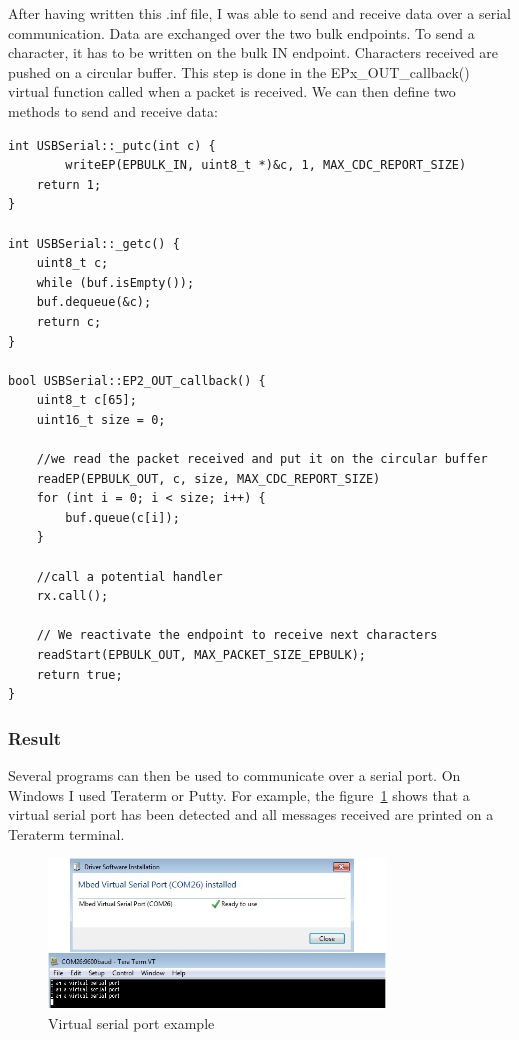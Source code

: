 \documentclass[pdftex,10pt,a4paper]{report}
\begin{document}
After having written this .inf file, I was able to send and receive data over a serial communication. Data are exchanged over the two bulk endpoints. To send a character, it has to be written  on the bulk IN endpoint. Characters received are pushed on a circular buffer. This step is done in the EPx\_OUT\_callback() virtual function called when a packet is received. We can then define two methods to send and receive data:

\begin{lstlisting}[label=USBSerial: putc and getc,caption=USBSerial: putc and getc]
int USBSerial::_putc(int c) {
		writeEP(EPBULK_IN, uint8_t *)&c, 1, MAX_CDC_REPORT_SIZE)
    return 1;
}

int USBSerial::_getc() {
    uint8_t c;
    while (buf.isEmpty());
    buf.dequeue(&c);
    return c;
}

bool USBSerial::EP2_OUT_callback() {
    uint8_t c[65];
    uint16_t size = 0;

    //we read the packet received and put it on the circular buffer
    readEP(EPBULK_OUT, c, size, MAX_CDC_REPORT_SIZE)
    for (int i = 0; i < size; i++) {
        buf.queue(c[i]);
    }

    //call a potential handler
    rx.call();

    // We reactivate the endpoint to receive next characters
    readStart(EPBULK_OUT, MAX_PACKET_SIZE_EPBULK);
    return true;
}
\end{lstlisting}

\subsubsection{Result}
Several programs can then be used to communicate over a serial port. On Windows I used Teraterm or Putty. For example, the figure~\ref{Virtual serial port example} shows that a virtual serial port has been detected and all messages received are printed on a Teraterm terminal.

\begin{figure}[h!]
		\centering
		\includegraphics[width=0.8\textwidth]{./serial_port_win.jpg}
		\caption{Virtual serial port example}
		\label{Virtual serial port example}
\end{figure}
\end{document}
